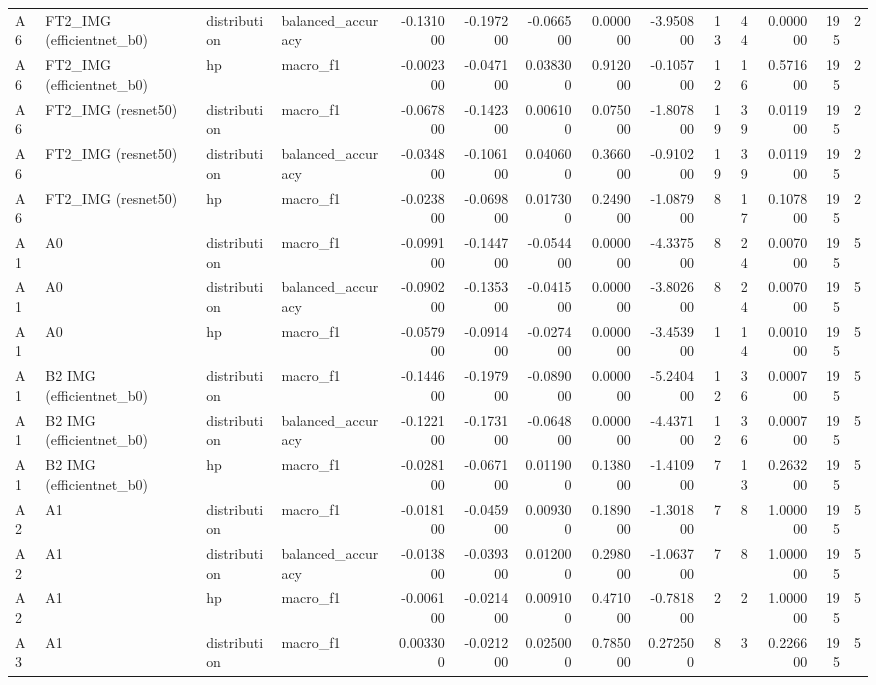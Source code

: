 \begin{table}
\begin{tabular}{llllrrrrrrrrrr}
A6 & FT2\_IMG (efficientnet\_b0) & distribution & balanced\_accuracy & -0.131000 & -0.197200 & -0.066500 & 0.000000 & -3.950800 & 13 & 44 & 0.000000 & 195 & 2 \\
A6 & FT2\_IMG (efficientnet\_b0) & hp & macro\_f1 & -0.002300 & -0.047100 & 0.038300 & 0.912000 & -0.105700 & 12 & 16 & 0.571600 & 195 & 2 \\
A6 & FT2\_IMG (resnet50) & distribution & macro\_f1 & -0.067800 & -0.142300 & 0.006100 & 0.075000 & -1.807800 & 19 & 39 & 0.011900 & 195 & 2 \\
A6 & FT2\_IMG (resnet50) & distribution & balanced\_accuracy & -0.034800 & -0.106100 & 0.040600 & 0.366000 & -0.910200 & 19 & 39 & 0.011900 & 195 & 2 \\
A6 & FT2\_IMG (resnet50) & hp & macro\_f1 & -0.023800 & -0.069800 & 0.017300 & 0.249000 & -1.087900 & 8 & 17 & 0.107800 & 195 & 2 \\
A1 & A0 & distribution & macro\_f1 & -0.099100 & -0.144700 & -0.054400 & 0.000000 & -4.337500 & 8 & 24 & 0.007000 & 195 & 5 \\
A1 & A0 & distribution & balanced\_accuracy & -0.090200 & -0.135300 & -0.041500 & 0.000000 & -3.802600 & 8 & 24 & 0.007000 & 195 & 5 \\
A1 & A0 & hp & macro\_f1 & -0.057900 & -0.091400 & -0.027400 & 0.000000 & -3.453900 & 1 & 14 & 0.001000 & 195 & 5 \\
A1 & B2 IMG (efficientnet\_b0) & distribution & macro\_f1 & -0.144600 & -0.197900 & -0.089000 & 0.000000 & -5.240400 & 12 & 36 & 0.000700 & 195 & 5 \\
A1 & B2 IMG (efficientnet\_b0) & distribution & balanced\_accuracy & -0.122100 & -0.173100 & -0.064800 & 0.000000 & -4.437100 & 12 & 36 & 0.000700 & 195 & 5 \\
A1 & B2 IMG (efficientnet\_b0) & hp & macro\_f1 & -0.028100 & -0.067100 & 0.011900 & 0.138000 & -1.410900 & 7 & 13 & 0.263200 & 195 & 5 \\
A2 & A1 & distribution & macro\_f1 & -0.018100 & -0.045900 & 0.009300 & 0.189000 & -1.301800 & 7 & 8 & 1.000000 & 195 & 5 \\
A2 & A1 & distribution & balanced\_accuracy & -0.013800 & -0.039300 & 0.012000 & 0.298000 & -1.063700 & 7 & 8 & 1.000000 & 195 & 5 \\
A2 & A1 & hp & macro\_f1 & -0.006100 & -0.021400 & 0.009100 & 0.471000 & -0.781800 & 2 & 2 & 1.000000 & 195 & 5 \\
A3 & A1 & distribution & macro\_f1 & 0.003300 & -0.021200 & 0.025000 & 0.785000 & 0.272500 & 8 & 3 & 0.226600 & 195 & 5 \\

\end{tabular}
\end{table}
